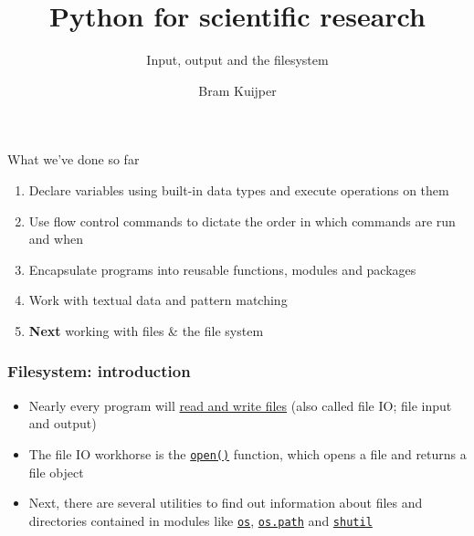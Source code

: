 \documentclass[xcolor=table]{beamer}
\title[Python for scientific research]{Python for scientific research}
\subtitle{Input, output and the filesystem}
\author{Bram Kuijper}
\institute[]{University of Exeter, Penryn Campus, UK}
\begin{document}
\begin{frame}
\titlepage
\end{frame}

\begin{frame}{What we've done so far}
	\begin{enumerate}\addtolength{\itemsep}{1\baselineskip}
		\item Declare variables using built-in data types and execute operations
		on them
		\item Use flow control commands to dictate the order in which commands are run
		and when
		\item Encapsulate programs into reusable functions, modules and packages
        \item Work with textual data and pattern matching
        \item \textbf{Next} working with files \& the file system 
	\end{enumerate}

\end{frame}


\begin{frame}[fragile]
    \frametitle{Filesystem: introduction}

    \begin{itemize}
        \item Nearly every program will \href{https://docs.python.org/3/tutorial/inputoutput.html\#reading-and-writing-files}{read and write files} (also called file IO; file input and output) \pause 
        \item The file IO workhorse is the \href{https://docs.python.org/3/library/functions.html\#open}{\texttt{open()}} function, which opens a file and returns a file object \pause
        \item Next, there are several utilities to find out information about files and directories
            contained in modules like \href{https://docs.python.org/3/library/os.html?highlight=os\#module-os}{\texttt{os}}, \href{https://docs.python.org/3/library/os.path.html}{\texttt{os.path}} and \href{https://docs.python.org/3/library/shutil.html#module-shutil}{\texttt{shutil}} 
    \end{itemize}
\end{frame}
\end{document}
